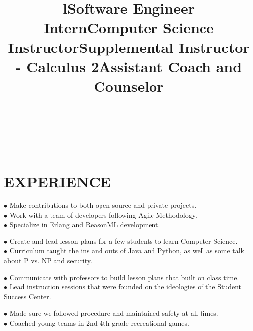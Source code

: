 \documentclass[margin]{res}
\begin{document}
\begin{resume}
\begin{format}
\title{l}\\
\\
\body\\
\end{format}

\section{EXPERIENCE}

\title{\textbf{Software Engineer Intern}}
\begin{position}
$\bullet$ Make contributions to both open source and private projects.\\
$\bullet$ Work with a team of developers following Agile Methodology.\\
$\bullet$ Specialize in Erlang and ReasonML development.
\end{position}

\title{\textbf{Computer Science Instructor}}
\begin{position}
$\bullet$ Create and lead lesson plans for a few students to learn Computer Science.\\
$\bullet$ Curriculum taught the ins and outs of Java and Python, as well as some talk about P vs. NP and security.
\end{position}

\title{\textbf{Supplemental Instructor - Calculus 2}}
\begin{position}
$\bullet$ Communicate with professors to build lesson plans that built on class time.\\
$\bullet$ Lead instruction sessions that were founded on the ideologies of the Student Success Center.
\end{position}

\title{\textbf{Assistant Coach and Counselor}}
\begin{position}
$\bullet$ Made sure we followed procedure and maintained safety at all times.\\
$\bullet$ Coached young teams in 2nd-4th grade recreational games.
\end{position}


\end{resume}
\end{document}
